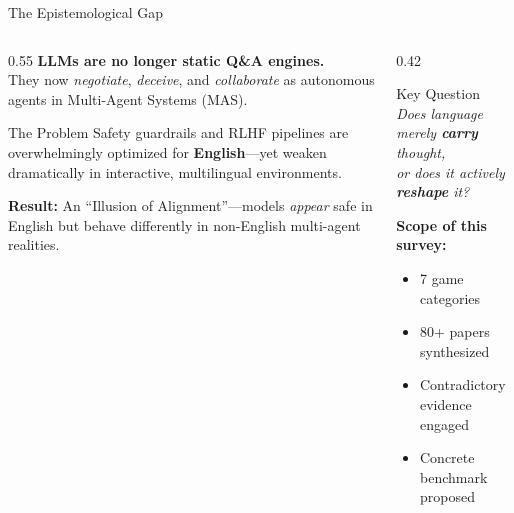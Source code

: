 \documentclass[11pt,aspectratio=169]{beamer}
\begin{document}
\begin{frame}{The Epistemological Gap}
    \begin{columns}[T]
        \begin{column}{0.55\textwidth}
            \textbf{LLMs are no longer static Q\&A engines.}\\[6pt]
            They now \textit{negotiate}, \textit{deceive}, and \textit{collaborate} as autonomous agents in Multi-Agent Systems (MAS).
            \vspace{0.4cm}

            \begin{alertblock}{The Problem}
                Safety guardrails and RLHF pipelines are overwhelmingly optimized for \textbf{English}---yet weaken dramatically in interactive, multilingual environments.
            \end{alertblock}

            \vspace{0.2cm}
            \textbf{Result:} An ``\textcolor{highlightred}{Illusion of Alignment}''---models \textit{appear} safe in English but behave differently in non-English multi-agent realities.
        \end{column}
        \begin{column}{0.42\textwidth}
            \begin{block}{Key Question}
                \centering
                \textit{Does language merely \textbf{carry} thought,\\or does it actively \textbf{reshape} it?}
            \end{block}
            \vspace{0.3cm}
            \footnotesize
            \textbf{Scope of this survey:}
            \begin{itemize}
                \item 7 game categories
                \item 80+ papers synthesized
                \item Contradictory evidence engaged
                \item Concrete benchmark proposed
            \end{itemize}
        \end{column}
    \end{columns}
\end{frame}
\end{document}
